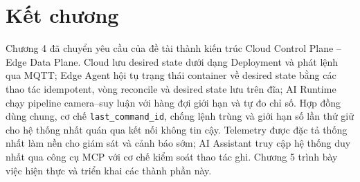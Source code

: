 \section{Kết chương}

Chương 4 đã chuyển yêu cầu của đề tài thành kiến trúc Cloud Control Plane --
Edge Data Plane. Cloud lưu desired state dưới dạng Deployment và phát lệnh qua
MQTT; Edge Agent hội tụ trạng thái container về desired state bằng các thao tác
idempotent, vòng reconcile và desired state lưu trên đĩa; AI Runtime chạy pipeline
camera--suy luận với hàng đợi giới hạn và tự đo chỉ số. Hợp đồng dùng chung,
cơ chế \texttt{last\_command\_id}, chống lệnh trùng và giới hạn số lần thử giữ cho
hệ thống nhất quán qua kết nối không tin cậy. Telemetry được đặc tả thống nhất
làm nền cho giám sát và cảnh báo sớm; AI Assistant truy cập hệ thống duy nhất qua
công cụ MCP với cơ chế kiểm soát thao tác ghi. Chương 5 trình bày việc hiện thực
và triển khai các thành phần này.
